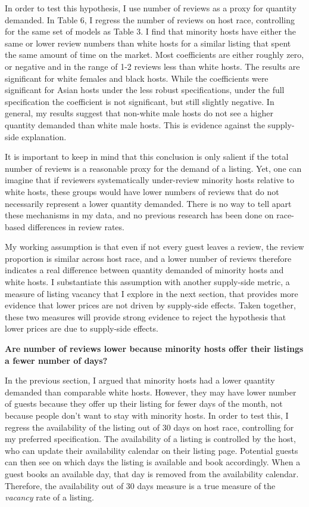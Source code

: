 In order to test this hypothesis, I use number of reviews as a proxy for quantity demanded. In Table 6, I regress the number of reviews on host race, controlling for the same set of models as Table 3. I find that minority hosts have either the same or lower review numbers than white hosts for a similar listing that spent the same amount of time on the market. Most coefficients are either roughly zero, or negative and in the range of 1-2 reviews less than white hosts. The results are significant for white females and black hosts. While the coefficients were significant for Asian hosts under the less robust specifications, under the full specification the coefficient is not significant, but still slightly negative. In general, my results suggest that non-white male hosts do not see a higher quantity demanded than white male hosts. This is evidence against the supply-side explanation. 

It is important to keep in mind that this conclusion is only salient if the total number of reviews is a reasonable proxy for the demand of a listing. Yet, one can imagine that if reviewers systematically under-review minority hosts relative to white hosts, these groups would have lower numbers of reviews that do not necessarily represent a lower quantity demanded. There is no way to tell apart these mechanisms in my data, and no previous research has been done on race-based differences in review rates. 

My working assumption is that even if not every guest leaves a review, the review proportion is similar across host race, and a lower number of reviews therefore indicates a real difference between quantity demanded of minority hosts and white hosts. I substantiate this assumption with another supply-side metric, a measure of listing vacancy that I explore in the next section, that provides more evidence that lower prices are not driven by supply-side effects. Taken together, these two measures will provide strong evidence to reject the hypothesis that lower prices are due to supply-side effects. 


\textbf{Are number of reviews lower because minority hosts offer their listings a fewer number of days?}

In the previous section, I argued that minority hosts had a lower quantity demanded than comparable white hosts. However, they may have lower number of guests because they offer up their listing for fewer days of the month, not because people don't want to stay with minority hosts. In order to test this, I regress the availability of the listing out of 30 days on host race, controlling for my preferred specification. The availability of a listing is controlled by the host, who can update their availability calendar on their listing page. Potential guests can then see on which days the listing is available and book accordingly. When a guest books an available day, that day is removed from the availability calendar. Therefore, the availability out of 30 days measure is a true measure of the \textit{vacancy} rate of a listing.

